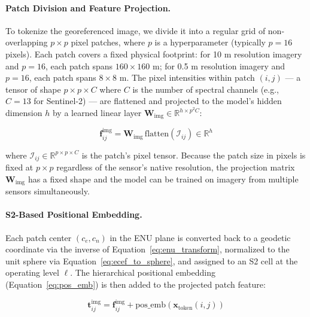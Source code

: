 \documentclass{book}
\begin{document}
\paragraph{Patch Division and Feature Projection.}

To tokenize the georeferenced image, we divide it into a regular grid
of non-overlapping $p \times p$ pixel patches, where $p$ is a
hyperparameter (typically $p = 16$ pixels).  Each patch covers a
fixed physical footprint: for 10 m resolution imagery and $p = 16$,
each patch spans $160 \times 160$ m; for 0.5 m resolution imagery and
$p = 16$, each patch spans $8 \times 8$ m.  The pixel intensities
within patch $(i, j)$ --- a tensor of shape $p \times p \times C$
where $C$ is the number of spectral channels (e.g., $C = 13$ for
Sentinel-2) --- are flattened and projected to the model's hidden
dimension $h$ by a learned linear layer
$\mathbf{W}_{\text{img}} \in \mathbb{R}^{h \times p^2 C}$:

\begin{equation}
  \mathbf{f}^{\text{img}}_{ij} =
    \mathbf{W}_{\text{img}}\,
    \mathrm{flatten}\!\left(\mathcal{I}_{ij}\right)
    \in \mathbb{R}^h
  \label{eq:img_patch_proj}
\end{equation}

where $\mathcal{I}_{ij} \in \mathbb{R}^{p \times p \times C}$ is the
patch's pixel tensor.  Because the patch size in pixels is fixed at
$p \times p$ regardless of the sensor's native resolution, the
projection matrix $\mathbf{W}_{\text{img}}$ has a fixed shape and
the model can be trained on imagery from multiple sensors
simultaneously.

\paragraph{S2-Based Positional Embedding.}

Each patch center $(c_e, c_n)$ in the ENU plane is converted back to
a geodetic coordinate via the inverse of
Equation~\eqref{eq:enu_transform}, normalized to the unit sphere via
Equation~\eqref{eq:ecef_to_sphere}, and assigned to an S2 cell at the
operating level $\ell$.  The hierarchical positional embedding
(Equation~\ref{eq:pos_emb}) is then added to the projected patch
feature:

\begin{equation}
  \mathbf{t}^{\text{img}}_{ij} =
    \mathbf{f}^{\text{img}}_{ij}
    + \text{pos\_emb}\!\left(\mathbf{x}_{\text{token}}(i,j)\right)
  \label{eq:img_token}
\end{equation}
\end{document}

